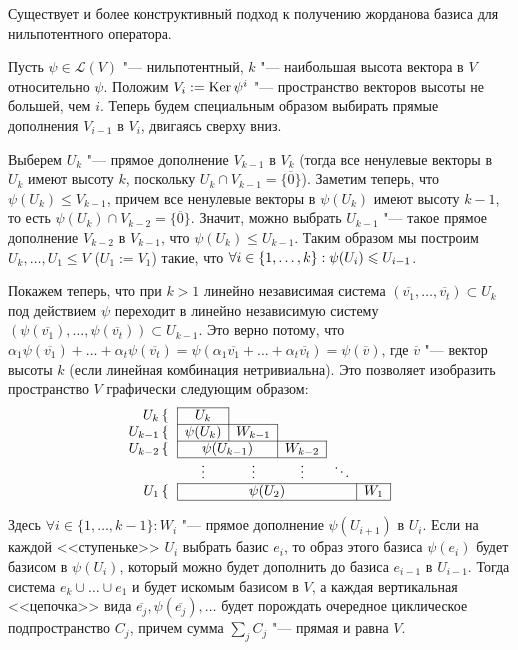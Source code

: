 \begin{note}
	Существует и более конструктивный подход к получению жорданова базиса для нильпотентного оператора.
	
	Пусть $\psi \in \mathcal{L}(V)$ "--- нильпотентный, $k$ "--- наибольшая высота вектора в $V$ относительно $\psi$. Положим $V_i := \operatorname{Ker}{\psi^i}$ "--- пространство векторов высоты не большей, чем $i$. Теперь будем специальным образом выбирать прямые дополнения $V_{i - 1}$ в $V_i$, двигаясь сверху вниз.
	
	Выберем $U_k$ "--- прямое дополнение $V_{k - 1}$ в $V_k$ (тогда все ненулевые векторы в $U_k$ имеют высоту $k$, поскольку $U_k \cap V_{k - 1} = \{\overline{0}\}$). Заметим теперь, что $\psi(U_k) \le V_{k - 1}$, причем все ненулевые векторы в $\psi(U_k)$ имеют высоту $k - 1$, то есть $\psi(U_k) \cap V_{k - 2} = \{\overline{0}\}$. Значит, можно выбрать $U_{k-1}$ "--- такое прямое дополнение $V_{k - 2}$ в $V_{k - 1}$, что $\psi(U_k) \le U_{k - 1}$. Таким образом мы построим $U_k, \dots, U_1 \le V$ ($U_1 := V_1$) такие, что $\forall i \hm{\in} \{1, \dots, k\}: \psi(U_i) \le U_{i - 1}$.
	
	Покажем теперь, что при $k > 1$ линейно независимая система $(\overline{v_1}, \dots, \overline{v_t}) \subset U_k$ под действием $\psi$ переходит в линейно независимую систему $(\psi(\overline{v_1}), \dots, \psi(\overline{v_t})) \subset U_{k - 1}$. Это верно потому, что $\alpha_1\psi(\overline{v_1}) + \dots + \alpha_t\psi(\overline{v_t}) = \psi(\alpha_1\overline{v_1} + \dots + \alpha_t\overline{v_t}) = \psi(\overline{v})$, где $\overline{v}$ "--- вектор	высоты $k$ (если линейная комбинация нетривиальна). Это позволяет изобразить пространство $V$ графически следующим образом:
	\[\begin{array}{@{}rccccc@{}}
		\cline{2-2}
		U_k \left\{\right.&\multicolumn{1}{|c|}{U_{k}} &&&&\\
		\cline{2-3}
		U_{k - 1} \left\{\right.&\multicolumn{1}{|c|}{\psi(U_k)} & \multicolumn{1}{c|}{W_{k - 1}} &&&\\
		\cline{2-4}
		U_{k - 2} \left\{\right.&\multicolumn{2}{|c|}{\psi(U_{k - 1})} & \multicolumn{1}{c|}{W_{k - 2}} &&\\
		\cline{2-4}
		&\vdots & \vdots & \vdots & \ddots &\\
		\cline{2-6}
		U_1 \left\{\right.&\multicolumn{4}{|c|}{\psi(U_2)} & \multicolumn{1}{c|}{W_1}\\
		\cline{2-6}
	\end{array}\]
	
	Здесь $\forall i \in \{1, \dots, k - 1\}: W_i$ "--- прямое дополнение $\psi(U_{i + 1})$ в $U_i$. Если на каждой <<ступеньке>> $U_i$ выбрать базис $e_i$, то образ этого базиса $\psi(e_i)$ будет базисом в $\psi(U_i)$, который можно будет дополнить до базиса $e_{i - 1}$ в $U_{i - 1}$. Тогда система $e_k \cup \dots \cup e_1$ и будет искомым базисом в $V$, а каждая вертикальная <<цепочка>> вида $\overline{e_j}, \psi(\overline{e_j}), \dots$ будет порождать очередное циклическое подпространство $C_j$, причем сумма $\sum_jC_j$ "--- прямая и равна $V$.
\end{note}

